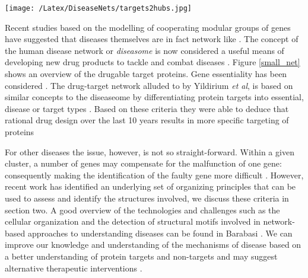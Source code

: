 \documentclass[a4paper,8pt,twocolumn,5p]{elsarticle}
\begin{document}
\begin{figure*}[ht]
  \begin{center}
 \texttt{[image: /Latex/DiseaseNets/targets2hubs.jpg]} %
  \end{center}
 \caption{Small fraction of the protein network with drug targets colored yellow and slightly larger in size, non-targets are colored light blue. However, based on their connectivity patterns, their biological and complex network statistics, some of the non-targets may be prove to be viable drug targets.}
\label{small_net}
\end{figure*}

Recent studies based on the modelling of cooperating modular groups of genes have suggested that diseases themselves are in fact network like \cite{BauerM2011}. The concept of the human disease network or \emph{diseasome} is now considered a useful means of developing new drug products to tackle and combat diseases \cite{He2011}.  Figure \ref{small_net} shows an overview of the drugable target proteins.  Gene essentiality has been considered \cite{Rancati2018}. The drug-target network alluded to by Yildirium {\it et al}, is based on similar concepts to the diseaseome by differentiating protein targets into essential, disease or target types \cite{Yildirium2007}. Based on these criteria they were able to deduce that rational drug design over the last 10 years results in more specific targeting of proteins

For other diseases  the issue, however, is not so straight-forward.  Within a given cluster, a number of genes may compensate for the malfunction of one gene: consequently making the identification of the faulty gene more difficult \cite{LeePark2008}.  However, recent work has identified an underlying set of organizing principles that can be used to assess and identify the structures involved, we  discuss these criteria in section two. A good overview of the technologies and challenges such as the cellular organization and the detection of structural motifs involved in network-based approaches to understanding diseases can be found in Barabasi  \cite{Barabasi2004}.  We can improve our knowledge and understanding of the mechanisms of disease based on a better understanding of protein targets and non-targets and may suggest alternative therapeutic interventions \cite{McGarry2017a,McGarry2017b}. 
\end{document}
